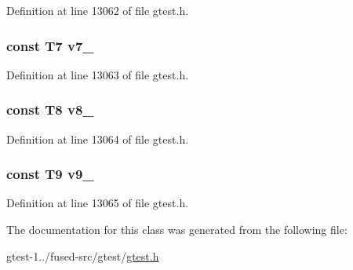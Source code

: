 \-Definition at line 13062 of file gtest.\-h.

\hypertarget{classtesting_1_1internal_1_1ValueArray47_a4063f0b7a528133d018ee488ba44a9a3}{
\subsubsection[{v7\-\_\-}]{\setlength{\rightskip}{0pt plus 5cm}const \-T7 {\bf v7\-\_\-}}}\label{d6/d6c/classtesting_1_1internal_1_1ValueArray47_a4063f0b7a528133d018ee488ba44a9a3}


\-Definition at line 13063 of file gtest.\-h.

\hypertarget{classtesting_1_1internal_1_1ValueArray47_a596bc5260b2474271d1f6910ff6f665d}{
\subsubsection[{v8\-\_\-}]{\setlength{\rightskip}{0pt plus 5cm}const \-T8 {\bf v8\-\_\-}}}\label{d6/d6c/classtesting_1_1internal_1_1ValueArray47_a596bc5260b2474271d1f6910ff6f665d}


\-Definition at line 13064 of file gtest.\-h.

\hypertarget{classtesting_1_1internal_1_1ValueArray47_a6356e16cf54a9dfac8525f20242af31e}{
\subsubsection[{v9\-\_\-}]{\setlength{\rightskip}{0pt plus 5cm}const \-T9 {\bf v9\-\_\-}}}\label{d6/d6c/classtesting_1_1internal_1_1ValueArray47_a6356e16cf54a9dfac8525f20242af31e}


\-Definition at line 13065 of file gtest.\-h.



\-The documentation for this class was generated from the following file\-:\begin{DoxyCompactItemize}
\item 
gtest-\/1../fused-\/src/gtest/\hyperlink{fused-src_2gtest_2gtest_8h}{gtest.\-h}\end{DoxyCompactItemize}
